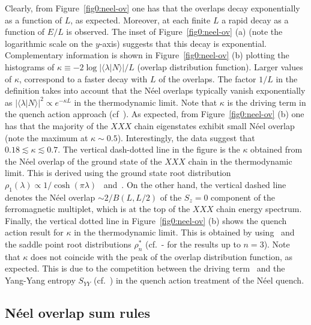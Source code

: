 \documentclass[11pt]{iopart}
\begin{document}
Clearly, from Figure~\ref{fig0:neel-ov} one has that the overlaps decay exponentially 
as a function of $L$, as expected. Moreover, at each finite $L$ a rapid decay as a 
function of $E/L$ is observed. The inset of Figure~\ref{fig0:neel-ov} (a) (note the 
logarithmic scale on the $y$-axis) suggests that this decay is exponential. Complementary 
information is shown in Figure~\ref{fig0:neel-ov} (b) plotting the histograms of $\kappa
\equiv-2\log|\langle\lambda|N\rangle|/L$ (overlap distribution function). Larger values 
of $\kappa$, correspond to a faster decay with $L$ of the overlaps. The factor $1/L$ 
in the definition takes into account that the N\'eel overlaps typically vanish 
exponentially as $|\langle\lambda|N\rangle|^2\propto e^{-\kappa L}$ in the thermodynamic 
limit. Note that $\kappa$ is the driving term in the quench action approach (cf~). 
As expected, from Figure~\ref{fig0:neel-ov} (b) one has that the majority of the 
$XXX$ chain eigenstates exhibit small N\'eel overlap (note the maximum at $\kappa\sim 0.5$). 
Interestingly, the data suggest that $0.18\lesssim\kappa\lesssim0.7$. The vertical 
dash-dotted line in the figure is the $\kappa$ obtained from the N\'eel overlap of 
the ground state of the $XXX$ chain in the thermodynamic limit. This is derived using 
the ground state root distribution $\rho_1(\lambda)\propto1/\cosh(\pi\lambda)$~\cite{taka-book} 
and~. On the other hand, the vertical dashed line denotes the N\'eel 
overlap $\sim 2/B(L,L/2)$ of the $S_z=0$ component of the ferromagnetic multiplet, which 
is at the top of the $XXX$ chain energy spectrum. Finally, the vertical dotted line in 
Figure~\ref{fig0:neel-ov} (b) shows the quench action result for $\kappa$ in the thermodynamic 
limit. This is obtained by using~ and the saddle point root distributions 
$\rho_n^*$ (cf.~- for the results up to $n=3$). Note that $\kappa$ 
does not coincide with the peak of the overlap distribution function, as expected. This is  
due to the competition between the driving term~ and the Yang-Yang entropy 
$S_{YY}$ (cf.~) in the quench action treatment of the N\'eel quench. 

\subsection{N\'eel overlap sum rules}
\label{sec:5.2}
\end{document}
